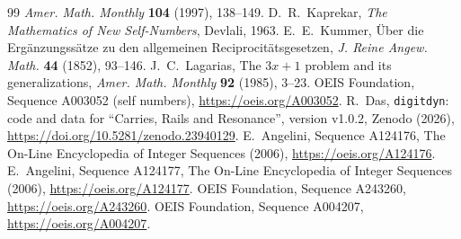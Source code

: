 \documentclass[11pt]{article}
\theoremstyle{definition}
\theoremstyle{remark}
\begin{document}
\begin{thebibliography}{99}
  \emph{Amer. Math. Monthly} \textbf{104} (1997), 138--149.
 D.~R.~Kaprekar, \emph{The Mathematics of New Self-Numbers},
  Devlali, 1963.
 E.~E.~Kummer, \"Uber die Erg\"anzungss\"atze zu den
  allgemeinen Reciprocit\"atsgesetzen, \emph{J. Reine Angew. Math.}
  \textbf{44} (1852), 93--146.
 J.~C.~Lagarias, The $3x+1$ problem and its
  generalizations, \emph{Amer. Math. Monthly} \textbf{92} (1985), 3--23.
 OEIS Foundation, Sequence A003052 (self numbers),
  \url{https://oeis.org/A003052}.
 R.~Das, \texttt{digitdyn}: code and data for
  ``Carries, Rails and Resonance'', version v1.0.2, Zenodo (2026),
  \url{https://doi.org/10.5281/zenodo.23940129}.
 E.~Angelini, Sequence A124176, The On-Line Encyclopedia
  of Integer Sequences (2006), \url{https://oeis.org/A124176}.
 E.~Angelini, Sequence A124177, The On-Line Encyclopedia
  of Integer Sequences (2006), \url{https://oeis.org/A124177}.
 OEIS Foundation, Sequence A243260,
  \url{https://oeis.org/A243260}.
 OEIS Foundation, Sequence A004207,
  \url{https://oeis.org/A004207}.
\end{thebibliography}
\end{document}
